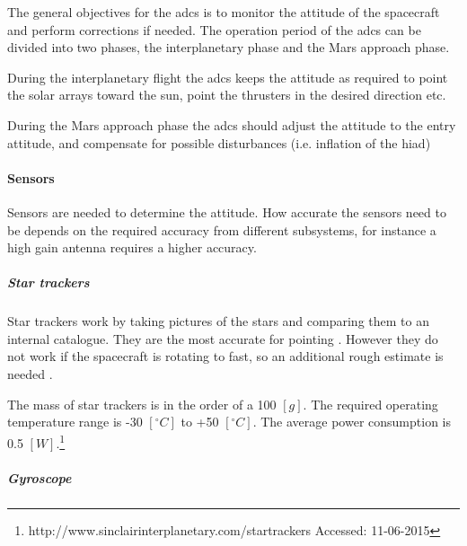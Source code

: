 The general objectives for the \gls{adcs} is to monitor the attitude of the spacecraft and perform corrections if needed. The operation period of the \gls{adcs} can be divided into two phases, the interplanetary phase and the Mars approach phase.

During the interplanetary flight the \gls{adcs} keeps the attitude as required to point the solar arrays toward the sun, point the thrusters in the desired direction etc.

During the Mars approach phase the \gls{adcs} should adjust the attitude to the entry attitude, and compensate for possible disturbances (i.e. inflation of the \gls{hiad})

\paragraph{Sensors}
Sensors are needed to determine the attitude. How accurate the sensors need to be depends on the required accuracy from different subsystems, for instance a high gain antenna requires a higher accuracy. 

\subparagraph{Star trackers}
Star trackers work by taking pictures of the stars and comparing them to an internal catalogue. They are the most accurate for pointing \cite{CarlChristianLiebe1995}. However they do not work if the spacecraft is rotating to fast, so an additional rough estimate is needed \cite[p. 584]{Wertz2011}. 

The mass of star trackers is in the order of a 100 $\left[g\right]$. The required operating temperature range is -30 $\left[^\circ C\right]$ to +50 $\left[^\circ C\right]$. The average power consumption is 0.5 $\left[W\right]$.\footnote{\label{ftn:star_tracker}http://www.sinclairinterplanetary.com/startrackers Accessed: 11-06-2015}

\subparagraph{Gyroscope}